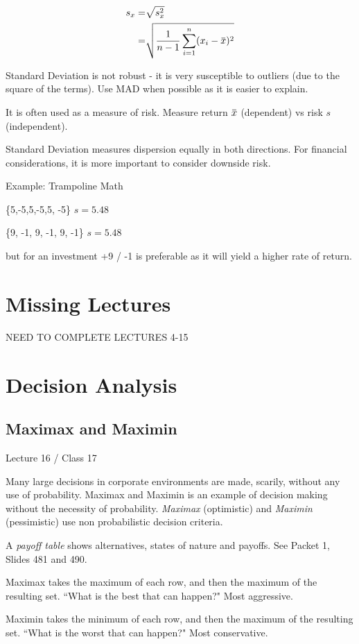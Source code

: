 \documentclass[11pt, oneside]{article}   	%
\newcommand{\overbar}[1]{\mkern 1.5mu\overline{\mkern-1.5mu#1\mkern-1.5mu}\mkern 1.5mu}
\begin{document}
\begin{align*}
s_x =& \sqrt{s^2_x} \\
      =& \sqrt{\frac{1}{n-1} \sum\limits_{i=1}^n (x_i - \overbar{x})^2}
\end{align*}

Standard Deviation is not robust - it is very susceptible to outliers (due to the square of the terms). Use MAD when possible as it is easier to explain.

It is often used as a measure of risk. Measure return $\overbar{x}$ (dependent) vs risk $s$ (independent).

Standard Deviation measures dispersion equally in both directions. For financial considerations, it is more important to consider downside risk.

Example: Trampoline Math

\{5,-5,5,-5,5, -5\} $s = 5.48$

\{9, -1, 9, -1, 9, -1\} $s = 5.48$

but for an investment +9 / -1 is preferable as it will yield a higher rate of return.


\section{Missing Lectures}
NEED TO COMPLETE LECTURES 4-15


\section{Decision Analysis}

\subsection{Maximax and Maximin}
Lecture 16 / Class 17

Many large decisions in corporate environments are made, scarily, without any use of probability. Maximax and Maximin is an example of decision making without the necessity of probability. 
\textit{Maximax} (optimistic) and \textit{Maximin} (pessimistic)  use non probabilistic decision criteria. 

A \textit{payoff table} shows alternatives, states of nature and payoffs. See Packet 1, Slides 481 and 490. 

Maximax takes the maximum of each row, and then the maximum of the resulting set. ``What is the best that can happen?" Most aggressive.

Maximin takes the minimum of each row, and then the maximum of the resulting set. ``What is the worst that can happen?" Most conservative.
\end{document}
